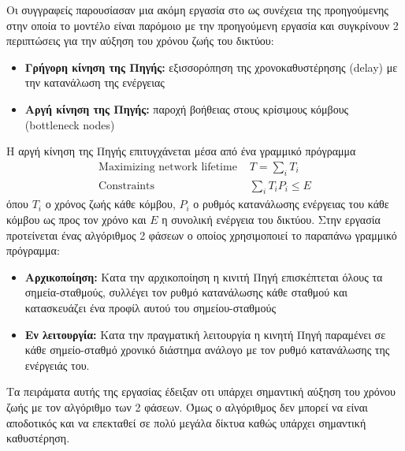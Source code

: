 Οι συγγραφείς παρουσίασαν μια ακόμη εργασία στο \cite{jointmobility_2006} ως συνέχεια της προηγούμενης στην οποία το μοντέλο είναι παρόμοιο με την προηγούμενη
εργασία και συγκρίνουν 2 περιπτώσεις για την αύξηση του χρόνου ζωής του δικτύου:
\begin{itemize}
\item \textbf{Γρήγορη κίνηση της Πηγής:} εξισσορόπηση της χρονοκαθυστέρησης (delay) με την κατανάλωση της ενέργειας
\item \textbf{Αργή κίνηση της Πηγής:} παροχή βοήθειας στους κρίσιμους κόμβους (bottleneck nodes)
\end{itemize}
Η αργή κίνηση της Πηγής επιτυγχάνεται μέσα από ένα γραμμικό πρόγραμμα
\begin{align*}
\text{Maximizing network lifetime } & T=\sum\limits_{i}T_{i}\\
\text{Constraints } & \sum\limits_{i}T_{i}P_{i}\leq E
\end{align*}
όπου $T_{i}$ ο χρόνος ζωής κάθε κόμβου, $P_{i}$ ο ρυθμός κατανάλωσης ενέργειας του κάθε κόμβου ως προς τον χρόνο και $E$ η συνολική ενέργεια του δικτύου.
Στην εργασία προτείνεται ένας αλγόριθμος 2 φάσεων ο οποίος χρησιμοποιεί το παραπάνω γραμμικό πρόγραμμα:
\begin{itemize}
\item \textbf{Αρχικοποίηση:} Κατα την αρχικοποίηση η κινιτή Πηγή επισκέπτεται όλους τα σημεία-σταθμούς, συλλέγει τον ρυθμό κατανάλωσης κάθε σταθμού και κατασκευάζει
ένα προφίλ αυτού του σημείου-σταθμούς
\item \textbf{Εν λειτουργία:} Κατα την πραγματική λειτουργία η κινητή Πηγή παραμένει σε κάθε σημείο-σταθμό χρονικό διάστημα ανάλογο με τον ρυθμό κατανάλωσης της
ενέργειάς του.
\end{itemize}
Τα πειράματα αυτής της εργασίας έδειξαν οτι υπάρχει σημαντική αύξηση του χρόνου ζωής με τον αλγόριθμο των 2 φάσεων. Όμως ο αλγόριθμος δεν μπορεί να είναι
αποδοτικός και να επεκταθεί σε πολύ μεγάλα δίκτυα καθώς υπάρχει σημαντική καθυστέρηση.


